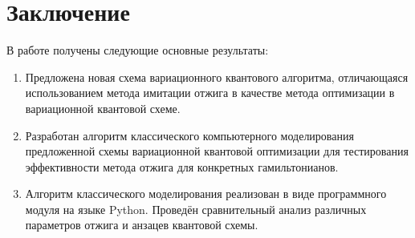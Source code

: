 \documentclass[a4paper]{report}
\begin{document}
\chapter*{Заключение}

В работе получены следующие основные результаты:
\begin{enumerate}
    \item{Предложена новая схема вариационного квантового алгоритма, отличающаяся использованием метода имитации отжига в качестве метода оптимизации в вариационной квантовой схеме.}
    \item{Разработан алгоритм классического компьютерного моделирования предложенной схемы вариационной квантовой оптимизации для тестирования эффективности метода отжига для конкретных гамильтонианов.}
    \item{Алгоритм классического моделирования реализован в виде программного модуля на языке Python. Проведён сравнительный анализ различных параметров отжига и анзацев квантовой схемы.}
\end{enumerate}



\end{document}

